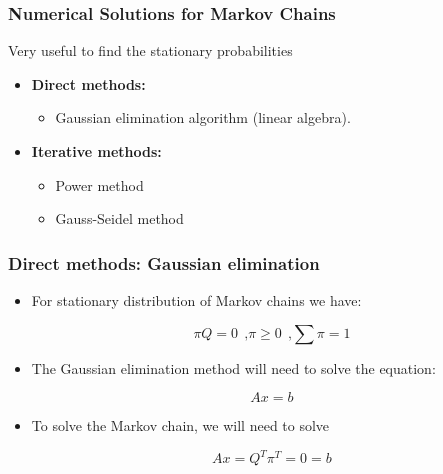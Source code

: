 \begin{frame}
    \frametitle{Numerical Solutions for Markov Chains}

        Very useful to find the stationary probabilities

        \begin{itemize}
            \item \textbf{Direct methods:}
            \begin{itemize}
                \item Gaussian elimination algorithm (linear algebra).
            \end{itemize}
            \item \textbf{Iterative methods:}
            \begin{itemize}
                \item Power method
                \item Gauss-Seidel method
            \end{itemize}
        \end{itemize}
\end{frame}



\begin{frame}
    \frametitle{Direct methods: Gaussian elimination}

        \begin{itemize}
            \item For stationary distribution of Markov chains we have:

            $$\pi Q = 0~~\text{,}\pi\geq 0~~\text{,}\sum \pi = 1$$

            \item The Gaussian elimination method will need to solve the equation:

            $$Ax = b$$

            \item To solve the Markov chain, we will need to solve

            $$Ax = Q^T\pi^T = 0 = b$$

        \end{itemize}
\end{frame}


